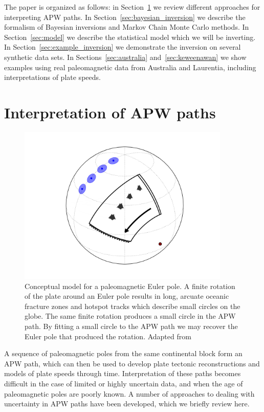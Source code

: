 \documentclass[preprint,12pt,authoryear]{elsarticle}
\begin{document}
The paper is organized as follows: in Section~\ref{sec:apwp} we review different
approaches for interpreting APW paths. In Section~\ref{sec:bayesian_inversion} we
describe the formalism of Bayesian inversions and Markov Chain Monte Carlo methods.
In Section~\ref{sec:model} we describe the statistical model which we will be inverting.
In Section~\ref{sec:example_inversion} we demonstrate the inversion on several
synthetic data sets. In Sections~\ref{sec:australia} and~\ref{sec:keweenawan}
we show examples using real paleomagnetic data from Australia and Laurentia,
including interpretations of plate speeds.

\section{Interpretation of APW paths}
\label{sec:apwp}
\begin{figure}
\includegraphics[width=0.9\textwidth]{figures/cartoon/paleomagnetic_euler_pole.png}
\caption[Conceptual model for a paleomagnetic Euler pole.]{Conceptual model for a paleomagnetic Euler pole. A finite rotation of the plate around an Euler pole results in long, arcuate oceanic fracture zones and hotspot tracks which describe small circles on the globe. The same finite rotation produces a small circle in the APW path. By fitting a small circle to the APW path we may recover the Euler pole that produced the rotation. Adapted from \citet{gordon1984paleomagnetic}}
\label{fig:pep}
\end{figure}
A sequence of paleomagnetic poles from the same continental block form an APW path,
which can then be used to develop plate tectonic reconstructions and models
of plate speeds through time. Interpretation of these paths becomes difficult in the
case of limited or highly uncertain data, and when the age of paleomagnetic poles are poorly
known. A number of approaches to dealing with uncertainty in APW paths have been developed,
which we briefly review here.
\end{document}
